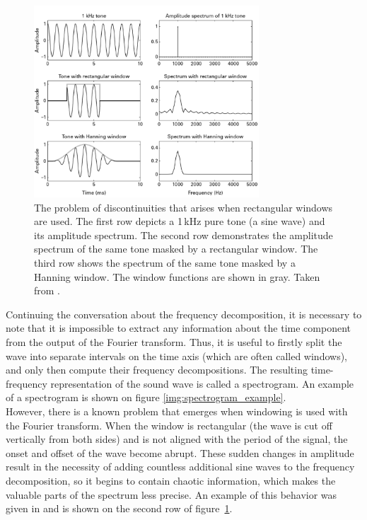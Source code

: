 \begin{figure}[t]
	\centering
	\includegraphics[width=0.75\textwidth]{include/windowing_example}
	\caption[An example of windowing and the problem of discontinuities]{The problem of discontinuities that arises when rectangular windows are used. The first row depicts a 1\,kHz pure tone (a sine wave) and its amplitude spectrum. The second row demonstrates the amplitude spectrum of the same tone masked by a rectangular window. The third row shows the spectrum of the same tone masked by a Hanning window. The window functions are shown in gray. Taken from \cite{Schnupp2011}.}
	\label{img:windowing_example}
\end{figure}

Continuing the conversation about the frequency decomposition, it is necessary to note that it is impossible to extract any information about the time component from the output of the Fourier transform. Thus, it is useful to firstly split the wave into separate intervals on the time axis (which are often called windows), and only then compute their frequency decompositions. The resulting time-frequency representation of the sound wave is called a spectrogram. An example of a spectrogram is shown on figure \ref{img:spectrogram_example}.\\

However, there is a known problem that emerges when windowing is used with the Fourier transform. When the window is rectangular (the wave is cut off vertically from both sides) and is not aligned with the period of the signal, the onset and offset of the wave become abrupt. These sudden changes in amplitude result in the necessity of adding countless additional sine waves to the frequency decomposition, so it begins to contain chaotic information, which makes the valuable parts of the spectrum less precise. An example of this behavior was given in \cite{Schnupp2011} and is shown on the second row of figure~\ref{img:windowing_example}.\\

